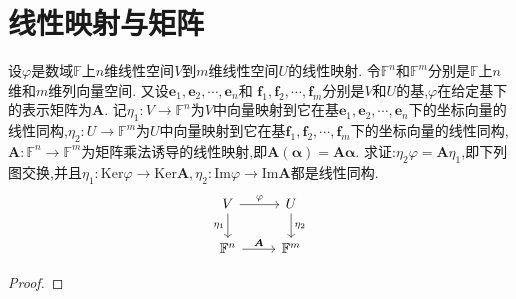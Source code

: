 \documentclass[../../main.tex]{subfiles}%
\begin{document}
\section{线性映射与矩阵}

\begin{theorem}\label{theorem:线性映射与矩阵基本定理}
设\(\varphi\)是数域\(\mathbb{F}\)上\(n\)维线性空间\(V\)到\(m\)维线性空间\(U\)的线性映射. 令\(\mathbb{F}^n\)和\(\mathbb{F}^m\)分别是\(\mathbb{F}\)上\(n\)维和\(m\)维列向量空间. 又设\(\boldsymbol{e}_1,\boldsymbol{e}_2,\cdots,\boldsymbol{e}_n\)和
\(\boldsymbol{f}_1,\boldsymbol{f}_2,\cdots,\boldsymbol{f}_m\)分别是\(V\)和\(U\)的基,\(\varphi\)在给定基下的表示矩阵为\(\boldsymbol{A}\). 记\(\eta_1:V\to\mathbb{F}^n\)为\(V\)中向量映射到它在基\(\boldsymbol{e}_1,\boldsymbol{e}_2,\cdots,\boldsymbol{e}_n\)下的坐标向量的线性同构,\(\eta_2:U\to\mathbb{F}^m\)为\(U\)中向量映射到它在基\(\boldsymbol{f}_1,\boldsymbol{f}_2,\cdots,\boldsymbol{f}_m\)下的坐标向量的线性同构,\(\boldsymbol{A}:\mathbb{F}^n\to\mathbb{F}^m\)为矩阵乘法诱导的线性映射,即\(\boldsymbol{A}(\boldsymbol{\alpha})=\boldsymbol{A}\boldsymbol{\alpha}\). 求证:\(\eta_2\varphi=\boldsymbol{A}\eta_1\),即下列图交换,并且\(\eta_1:\text{Ker}\varphi\to\text{Ker}\boldsymbol{A},\eta_2:\text{Im}\varphi\to\text{Im}\boldsymbol{A}\)都是线性同构.
\[\begin{tikzcd}
V \arrow[r, "\varphi"] \arrow[d, "\eta_1"'] & U \arrow[d, "\eta_2"] \\
\mathbb{F}^n \arrow[r, "\boldsymbol{A}"]    & \mathbb{F}^m         
\end{tikzcd}
\]
\end{theorem}
\begin{proof}



\end{proof}
\end{document}
